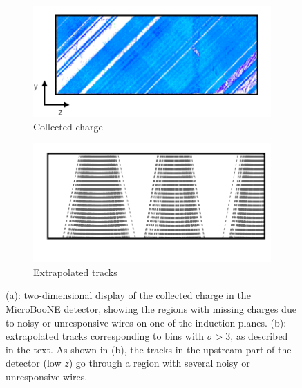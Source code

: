 \documentclass[a4paper,11pt]{article}
\begin{document}
\begin{figure}[htbp]
  \begin{center}
    \begin{subfigure}{0.48\textwidth}
      \includegraphics[width=\linewidth]{figures/chargecoll.png}
      \caption{Collected charge}
    \end{subfigure}
    \begin{subfigure}{0.48\textwidth}
      \includegraphics[width=\linewidth]{figures/extrtracks.png}
      \caption{Extrapolated tracks}
    \end{subfigure}

    \caption{(a): two-dimensional display of the collected charge in the MicroBooNE detector, showing the regions with missing charges due to noisy or unresponsive wires on one of the induction planes. (b): extrapolated tracks corresponding to bins with $\sigma>3$, as described in the text. As shown in (b), the tracks in the upstream part of the detector (low $z$) go through a region with several noisy or unresponsive wires.} \label{fig:wires}
  \end{center}
\end{figure}
\end{document}
